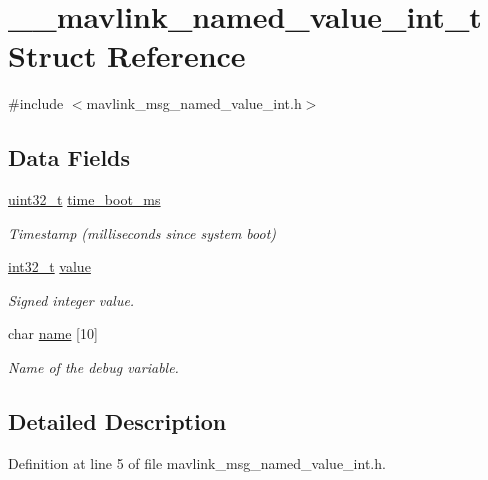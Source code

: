 \hypertarget{struct____mavlink__named__value__int__t}{\section{\-\_\-\-\_\-mavlink\-\_\-named\-\_\-value\-\_\-int\-\_\-t Struct Reference}
\label{struct____mavlink__named__value__int__t}
}


{\ttfamily \#include $<$mavlink\-\_\-msg\-\_\-named\-\_\-value\-\_\-int.\-h$>$}

\subsection*{Data Fields}
\begin{DoxyCompactItemize}
\item 
\hyperlink{stdint_8h_a435d1572bf3f880d55459d9805097f62}{uint32\-\_\-t} \hyperlink{struct____mavlink__named__value__int__t_ab9e1d97f4b6a53bac6086743223c4249}{time\-\_\-boot\-\_\-ms}
\begin{DoxyCompactList}\small\item\em Timestamp (milliseconds since system boot) \end{DoxyCompactList}\item 
\hyperlink{group___n_a_m_e_gafd12020da5a235dfcf0c3c748fb5baed}{int32\-\_\-t} \hyperlink{struct____mavlink__named__value__int__t_ab6bdae0f70ba0c8bece0d206c0075fef}{value}
\begin{DoxyCompactList}\small\item\em Signed integer value. \end{DoxyCompactList}\item 
char \hyperlink{struct____mavlink__named__value__int__t_acd99d286e407b448288e54c586229d66}{name} \mbox{[}10\mbox{]}
\begin{DoxyCompactList}\small\item\em Name of the debug variable. \end{DoxyCompactList}\end{DoxyCompactItemize}


\subsection{Detailed Description}


Definition at line 5 of file mavlink\-\_\-msg\-\_\-named\-\_\-value\-\_\-int.\-h.



